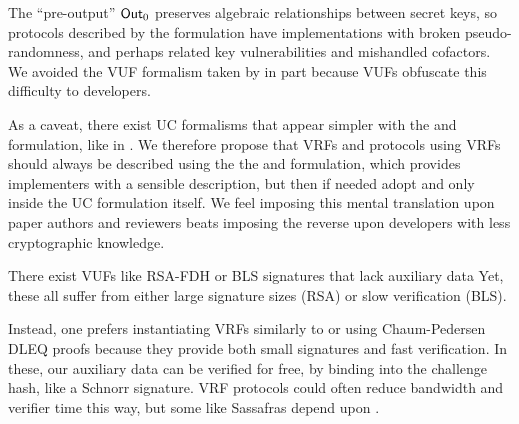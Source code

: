 The ``pre-output'' ${\mathsf{Out}}_0$ preserves algebraic relationships between
secret keys, so protocols described by the  formulation
have implementations with broken pseudo-randomness, and perhaps
 related key vulnerabilities and mishandled cofactors.
We avoided the VUF formalism taken by \cite{agg_dkg} in part because
 VUFs obfuscate this difficulty to developers.

As a caveat, there exist UC formalisms that appear simpler with
the  and  formulation, like in \cite{praos}.
We therefore propose that VRFs and protocols using VRFs should always be
described using the the \Sign and \Verify formulation, which provides
implementers with a sensible description, but then if needed adopt
  and  only inside the UC formulation itself.
We feel imposing this mental translation upon paper authors and reviewers
 beats imposing the reverse upon developers with less cryptographic knowledge.

\smallskip

There exist VUFs like RSA-FDH or BLS signatures that lack auxiliary data
Yet, these all suffer from either large signature sizes (RSA) or
 slow verification (BLS).

Instead, one prefers instantiating VRFs similarly to
 \cite{nsec5} or \cite{VXEd25519} using Chaum-Pedersen DLEQ proofs \cite{CP92} %
 because they provide both small signatures and fast verification.
In these, our auxiliary data \aux can be verified for free,
by binding \aux into the challenge hash, like a Schnorr signature.
VRF protocols could often reduce bandwidth and verifier time this way,
 but some like Sassafras depend upon \aux. 





\endinput %






























